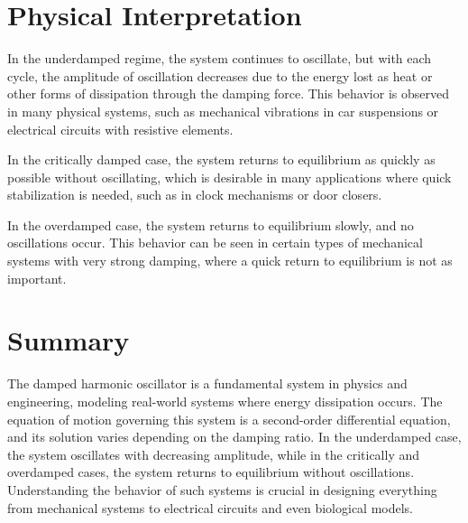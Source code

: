 \documentclass{article}
\begin{document}
\section{Physical Interpretation} 


In the underdamped regime, the system continues to oscillate, but with each cycle, the amplitude of oscillation decreases due to the energy lost as heat or other forms of dissipation through the damping force. This behavior is observed in many physical systems, such as mechanical vibrations in car suspensions or electrical circuits with resistive elements.

In the critically damped case, the system returns to equilibrium as quickly as possible without oscillating, which is desirable in many applications where quick stabilization is needed, such as in clock mechanisms or door closers.

In the overdamped case, the system returns to equilibrium slowly, and no oscillations occur. This behavior can be seen in certain types of mechanical systems with very strong damping, where a quick return to equilibrium is not as important.

\section{Summary}

The damped harmonic oscillator is a fundamental system in physics and engineering, modeling real-world systems where energy dissipation occurs. The equation of motion governing this system is a second-order differential equation, and its solution varies depending on the damping ratio. In the underdamped case, the system oscillates with decreasing amplitude, while in the critically and overdamped cases, the system returns to equilibrium without oscillations. Understanding the behavior of such systems is crucial in designing everything from mechanical systems to electrical circuits and even biological models.
\end{document}
